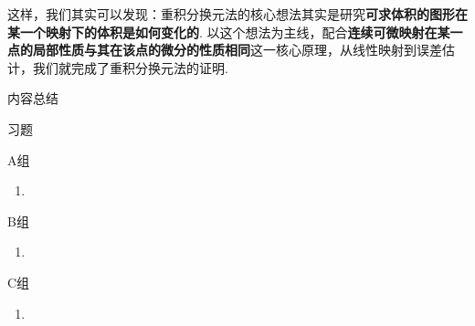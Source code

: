 这样，我们其实可以发现：重积分换元法的核心想法其实是研究\textbf{可求体积的图形在某一个映射下的体积是如何变化的}. 以这个想法为主线，配合\textbf{连续可微映射在某一点的局部性质与其在该点的微分的性质相同}这一核心原理，从线性映射到误差估计，我们就完成了重积分换元法的证明.

\vspace{2ex}
\centerline{\heiti \Large 内容总结}

\vspace{2ex}
\centerline{\heiti \Large 习题}

\vspace{2ex}
{\kaishu }
\begin{flushright}
    \kaishu

\end{flushright}

\centerline{\heiti A组}
\begin{enumerate}
    \item %
\end{enumerate}

\centerline{\heiti B组}
\begin{enumerate}
    \item
\end{enumerate}

\centerline{\heiti C组}
\begin{enumerate}
    \item
\end{enumerate}
